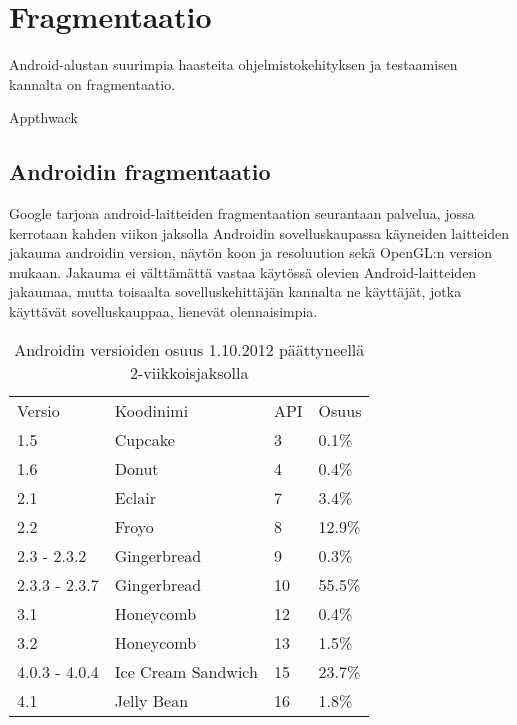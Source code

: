 \section{Fragmentaatio}

Android-alustan suurimpia haasteita ohjelmistokehityksen ja testaamisen kannalta on fragmentaatio.

Appthwack\cite{appthwack}


\subsection{Androidin fragmentaatio}

Google tarjoaa android-laitteiden fragmentaation seurantaan palvelua, jossa kerrotaan kahden viikon jaksolla Androidin sovelluskaupassa käyneiden laitteiden jakauma androidin version, näytön koon ja resoluution sekä OpenGL:n version mukaan.\cite{android_versions} Jakauma ei välttämättä vastaa käytössä olevien Android-laitteiden jakaumaa, mutta toisaalta sovelluskehittäjän kannalta ne käyttäjät, jotka käyttävät sovelluskauppaa, lienevät olennaisimpia.

\begin{table}[h]
\centering
\begin{tabular}{ l l l l }
  Versio & Koodinimi & API & Osuus \\
  1.5 & Cupcake & 3 & 0.1\% \\
  1.6 & Donut & 4 & 0.4\% \\
  2.1 & Eclair & 7 & 3.4\% \\
  2.2 & Froyo & 8 & 12.9\% \\
  2.3 - 2.3.2 & Gingerbread & 9 & 0.3\% \\
  2.3.3 - 2.3.7 & Gingerbread & 10 & 55.5\% \\
  3.1 & Honeycomb & 12 & 0.4\% \\
  3.2 & Honeycomb & 13 & 1.5\% \\
  4.0.3 - 4.0.4 & Ice Cream Sandwich & 15 & 23.7\% \\
  4.1 & Jelly Bean & 16 & 1.8\% \\
\end{tabular}
\caption{Androidin versioiden osuus 1.10.2012 päättyneellä 2-viikkoisjaksolla}
\label{tab:android_versions}
\end{table}

